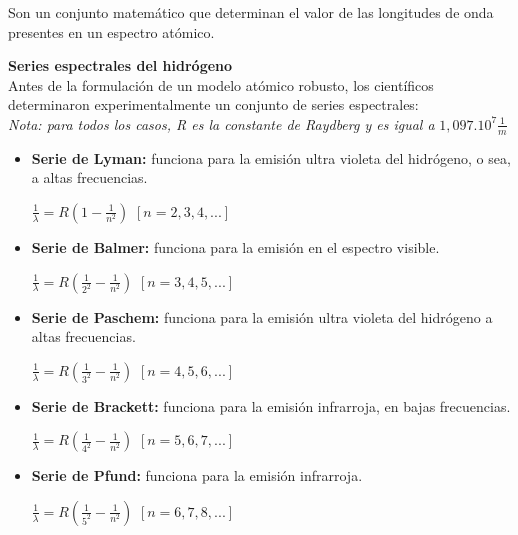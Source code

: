 \documentclass[a4paper]{article}
\begin{document}
        \indent Son un conjunto matemático que determinan el valor de las longitudes de onda presentes en un espectro atómico.

        \textbf{Series espectrales del hidrógeno} \\
            Antes de la formulación de un modelo atómico robusto, los científicos determinaron experimentalmente un conjunto de series espectrales: \\

            \textit{Nota: para todos los casos, R es la constante de Raydberg y es igual a} $1,097 . 10^7 \frac{1}{m}$ \\

            \begin{itemize}
                \item \textbf{Serie de Lyman:} funciona para la emisión ultra violeta del hidrógeno, o sea, a altas frecuencias. 
                    \begin{center}
                        $\frac {1}{\lambda} = R(1 - {\frac{1}{n^2}})$ \hspace{2mm} $[n = 2,3,4,...]$
                    \end{center}

                \item \textbf{Serie de Balmer:} funciona para la emisión en el espectro visible.
                    \begin{center}
                        $\frac {1}{\lambda} = R({\frac{1}{2^2}} - {\frac{1}{n^2}})$ \hspace{2mm} $[n = 3,4,5,...]$
                    \end{center}

                \item \textbf{Serie de Paschem:} funciona para la emisión ultra violeta del hidrógeno a altas frecuencias.
                    \begin{center}
                        $\frac {1}{\lambda} = R({\frac{1}{3^2}} - {\frac{1}{n^2}})$ \hspace{2mm} $[n = 4,5,6,...]$
                    \end{center}

                \item \textbf{Serie de Brackett:} funciona para la emisión infrarroja, en bajas frecuencias.
                    \begin{center}
                        $\frac {1}{\lambda} = R({\frac{1}{4^2}} - {\frac{1}{n^2}})$ \hspace{2mm} $[n = 5,6,7,...]$
                    \end{center}

                \item \textbf{Serie de Pfund:} funciona para la emisión infrarroja.
                    \begin{center}
                        $\frac {1}{\lambda} = R({\frac{1}{5^2}} - {\frac{1}{n^2}})$ \hspace{2mm} $[n = 6,7,8,...]$
                    \end{center}
            \end{itemize}
\end{document}
